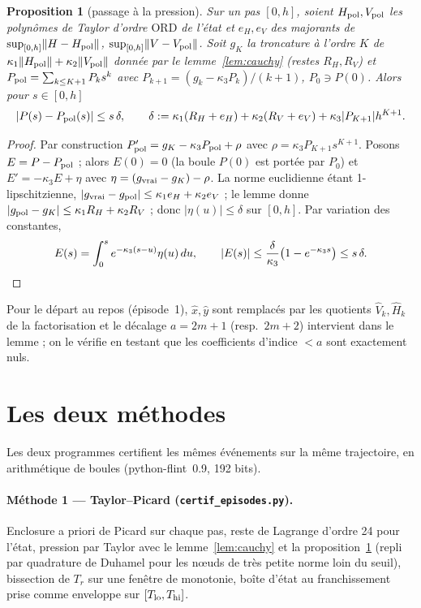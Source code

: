 \documentclass[11pt,a4paper]{article}
\newtheorem{proposition}[theoreme]{Proposition}
\theoremstyle{remark}
\newcommand{\norm}[1]{\lVert #1\rVert}
\begin{document}
\begin{proposition}[passage à la pression]\label{prop:P}
Sur un pas $[0,h]$, soient $H_{\rm pol},V_{\rm pol}$ les polynômes de Taylor d'ordre $\mathrm{ORD}$ de l'état et $e_H,e_V$ des majorants de $\sup_{[0,h]}\norm{H-H_{\rm pol}}$, $\sup_{[0,h]}\norm{V-V_{\rm pol}}$. Soit $g_K$ la troncature à l'ordre $K$ de $\kappa_1\norm{H_{\rm pol}}+\kappa_2\norm{V_{\rm pol}}$ donnée par le lemme~\ref{lem:cauchy} (restes $R_H,R_V$) et $P_{\rm pol}=\sum_{k\le K+1}P_ks^k$ avec $P_{k+1}=(g_k-\kappa_3P_k)/(k+1)$, $P_0\ni P(0)$. Alors pour $s\in[0,h]$
\[ |P(s)-P_{\rm pol}(s)|\le s\,\delta,\qquad \delta:=\kappa_1(R_H+e_H)+\kappa_2(R_V+e_V)+\kappa_3|P_{K+1}|h^{K+1}. \]
\end{proposition}
\begin{proof}
Par construction $P_{\rm pol}'=g_K-\kappa_3P_{\rm pol}+\rho$ avec $\rho=\kappa_3P_{K+1}s^{K+1}$. Posons $E=P-P_{\rm pol}$ ; alors $E(0)=0$ (la boule $P(0)$ est portée par $P_0$) et $E'=-\kappa_3E+\eta$ avec $\eta=(g_{\rm vrai}-g_K)-\rho$. La norme euclidienne étant 1-lipschitzienne, $|g_{\rm vrai}-g_{\rm pol}|\le\kappa_1e_H+\kappa_2e_V$ ; le lemme donne $|g_{\rm pol}-g_K|\le\kappa_1R_H+\kappa_2R_V$ ; donc $|\eta(u)|\le\delta$ sur $[0,h]$. Par variation des constantes,
\[ E(s)=\int_0^se^{-\kappa_3(s-u)}\eta(u)\,du,\qquad |E(s)|\le\frac{\delta}{\kappa_3}\bigl(1-e^{-\kappa_3s}\bigr)\le s\,\delta .\qedhere\]
\end{proof}
Pour le départ au repos (épisode~1), $\hat x,\hat y$ sont remplacés par les quotients $\hat V_k,\hat H_k$ de la factorisation et le décalage $a=2m+1$ (resp.\ $2m+2$) intervient dans le lemme ; on le vérifie en testant que les coefficients d'indice $<a$ sont exactement nuls.

\section{Les deux méthodes}\label{sec:methodes}
Les deux programmes certifient les mêmes événements sur la même trajectoire, en arithmétique de boules (python-flint~0.9, 192 bits).

\paragraph{Méthode 1 --- Taylor--Picard (\texttt{certif\_episodes.py}).} Enclosure a priori de Picard sur chaque pas, reste de Lagrange d'ordre 24 pour l'état, pression par Taylor avec le lemme~\ref{lem:cauchy} et la proposition~\ref{prop:P} (repli par quadrature de Duhamel pour les nœuds de très petite norme loin du seuil), bissection de $T_r$ sur une fenêtre de monotonie, boîte d'état au franchissement prise comme enveloppe sur $[T_{\rm lo},T_{\rm hi}]$.
\end{document}
